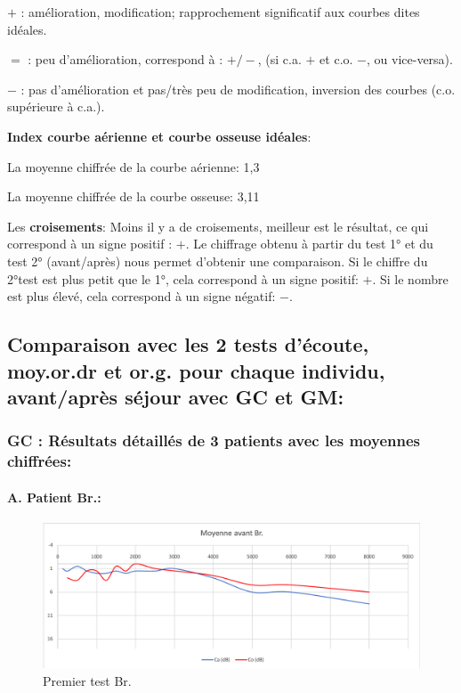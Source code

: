 $+$   : amélioration, modification;  rapprochement significatif aux courbes dites idéales.

$=$   : peu d'amélioration, correspond à : $+/-$, (si c.a. $ + $ et c.o. $-$, ou vice-versa).

$-$   : pas d'amélioration et pas/très peu  de modification, inversion des courbes (c.o. supérieure à c.a.).

\textbf{Index courbe aérienne et courbe osseuse idéales}:

La moyenne chiffrée de la courbe aérienne: 1,3


La moyenne chiffrée de la courbe osseuse: 3,11

Les \textbf{croisements}:
Moins il y a de croisements, meilleur est le résultat, ce qui correspond à un signe positif : $+$.
Le chiffrage obtenu à partir du test 1° et du test 2° (avant/après) nous permet d'obtenir une comparaison.
Si le chiffre du 2°test est plus petit que le 1°, cela correspond à un signe positif: $+$.
Si le nombre est plus élevé, cela correspond à un signe négatif: $-$.

   
      \subsection{ Comparaison avec les 2 tests d'écoute, moy.or.dr et or.g. pour chaque individu,
       avant/après séjour avec GC et GM:
       }

       \subsubsection{ GC : Résultats détaillés de 3 patients avec les moyennes chiffrées:}



       
      \paragraph{ A. Patient Br.:}
  \begin{figure}
\centering
\includegraphics[width=0.7\linewidth]{images/graphiques/bru_pre.png}
\caption[Moyenne OG+OD]{Premier test Br.}
       
\label{groupecontroleimage1}
\end{figure}

